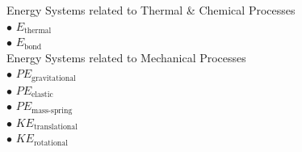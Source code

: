 {	\noindent
	Energy Systems related to Thermal \& Chemical Processes
		\\\hspace*{1em}$\bullet$ $E_\text{thermal}$
		\\\hspace*{1em}$\bullet$ $E_\text{bond}$\\
	
	\noindent
	Energy Systems related to Mechanical Processes
		\\\hspace*{1em}$\bullet$ $PE_\text{gravitational}$
		\\\hspace*{1em}$\bullet$ $PE_\text{elastic}$
		\\\hspace*{1em}$\bullet$ $PE_\text{mass-spring}$
		\\\hspace*{1em}$\bullet$ $KE_\text{translational}$
		\\\hspace*{1em}$\bullet$ $KE_\text{rotational}$
	}
